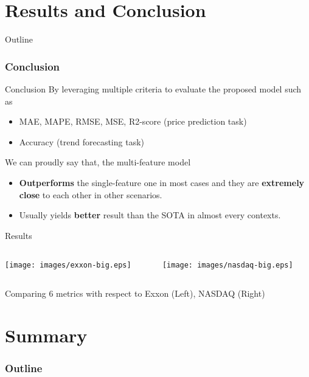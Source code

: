 \documentclass[compress, mathserif, fleqn, 10pt]{beamer}
\begin{document}
	\section{Results and Conclusion}
	\begin{frame}{Outline}
		\tableofcontents[currentsection]
	\end{frame}
	
	\begin{frame}
		\frametitle{Conclusion}
		\begin{block}{Conclusion}
			\smallskip
			By leveraging multiple criteria to evaluate the proposed model such as
			\begin{itemize}
				\item MAE, MAPE, RMSE, MSE, R2-score (price prediction task)
				\smallskip
				
				\item Accuracy (trend forecasting task)
			\end{itemize}
			\bigskip
			
			We can proudly say that, the multi-feature model
			\begin{itemize}
				\item \textbf{Outperforms} the single-feature one in most cases and they
				are \textbf{extremely close} to each other in other scenarios.
				\smallskip
				
				\item Usually yields \textbf{better} result than the SOTA in almost
				every contexts.
			\end{itemize}
			\smallskip
		\end{block}
	\end{frame}
	
	\begin{frame}{Results}
		\begin{columns}
			\begin{column}{0.5\textwidth}
				\centerline{\texttt{[image: images/exxon-big.eps]}}
			\end{column}
			\begin{column}{0.5\textwidth}
				\centerline{\texttt{[image: images/nasdaq-big.eps]}}
			\end{column}
		\end{columns}
		
		\smallskip
		\centerline{Comparing 6 metrics with respect to Exxon (Left), NASDAQ (Right)}
	\end{frame}
	
	\section{Summary}
	\begin{frame}
		\frametitle{Outline}
		\tableofcontents[currentsection]
	\end{frame}
	
\end{document}
